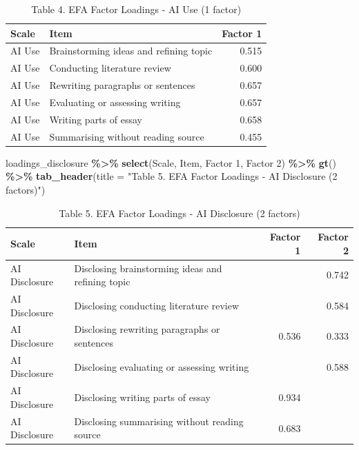 \documentclass[
]{article}
\newenvironment{Shaded}{\begin{snugshade}}{\end{snugshade}}
\newcommand{\AttributeTok}[1]{\textcolor[rgb]{0.13,0.29,0.53}{#1}}
\newcommand{\FunctionTok}[1]{\textcolor[rgb]{0.13,0.29,0.53}{\textbf{#1}}}
\newcommand{\NormalTok}[1]{#1}
\newcommand{\SpecialCharTok}[1]{\textcolor[rgb]{0.81,0.36,0.00}{\textbf{#1}}}
\newcommand{\StringTok}[1]{\textcolor[rgb]{0.31,0.60,0.02}{#1}}
\begin{document}
\begin{table}[t]
\caption*{
{\fontsize{20}{25}\selectfont  Table 4. EFA Factor Loadings - AI Use (1 factor)\fontsize{12}{15}\selectfont }
} 
\fontsize{12.0pt}{14.0pt}\selectfont
\begin{tabular*}{\linewidth}{@{\extracolsep{\fill}}llr}
\toprule
Scale & Item & Factor 1 \\ 
\midrule\addlinespace[2.5pt]
AI Use & Brainstorming ideas and refining topic & 0.515 \\ 
AI Use & Conducting literature review & 0.600 \\ 
AI Use & Rewriting paragraphs or sentences & 0.657 \\ 
AI Use & Evaluating or assessing writing & 0.657 \\ 
AI Use & Writing parts of essay & 0.658 \\ 
AI Use & Summarising without reading source & 0.455 \\ 
\bottomrule
\end{tabular*}
\end{table}

\begin{Shaded}
\begin{Highlighting}[]
\NormalTok{loadings\_disclosure }\SpecialCharTok{\%\textgreater{}\%}
  \FunctionTok{select}\NormalTok{(Scale, Item, }\StringTok{\textasciigrave{}}\AttributeTok{Factor 1}\StringTok{\textasciigrave{}}\NormalTok{, }\StringTok{\textasciigrave{}}\AttributeTok{Factor 2}\StringTok{\textasciigrave{}}\NormalTok{) }\SpecialCharTok{\%\textgreater{}\%}
  \FunctionTok{gt}\NormalTok{() }\SpecialCharTok{\%\textgreater{}\%}
  \FunctionTok{tab\_header}\NormalTok{(}\AttributeTok{title =} \StringTok{"Table 5. EFA Factor Loadings {-} AI Disclosure (2 factors)"}\NormalTok{)}
\end{Highlighting}
\end{Shaded}

\begin{table}[t]
\caption*{
{\fontsize{20}{25}\selectfont  Table 5. EFA Factor Loadings - AI Disclosure (2 factors)\fontsize{12}{15}\selectfont }
} 
\fontsize{12.0pt}{14.0pt}\selectfont
\begin{tabular*}{\linewidth}{@{\extracolsep{\fill}}llrr}
\toprule
Scale & Item & Factor 1 & Factor 2 \\ 
\midrule\addlinespace[2.5pt]
AI Disclosure & Disclosing brainstorming ideas and refining topic &  & 0.742 \\ 
AI Disclosure & Disclosing conducting literature review &  & 0.584 \\ 
AI Disclosure & Disclosing rewriting paragraphs or sentences & 0.536 & 0.333 \\ 
AI Disclosure & Disclosing evaluating or assessing writing &  & 0.588 \\ 
AI Disclosure & Disclosing writing parts of essay & 0.934 &  \\ 
AI Disclosure & Disclosing summarising without reading source & 0.683 &  \\ 
\bottomrule
\end{tabular*}
\end{table}
\end{document}
